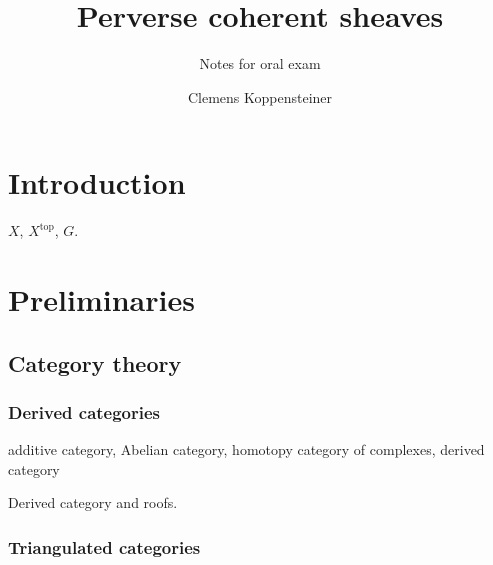 \documentclass[english]{short-notes}
\title{Perverse coherent sheaves}
\subtitle{Notes for oral exam}
\author{Clemens Koppensteiner}
\begin{document}
\renewcommand\top{\mathrm{top}}
\renewcommand\dual{\mathbb D}

\maketitle

\tableofcontents

\section{Introduction}

$X$, $X^\top$, $G$.

\section{Preliminaries}

\subsection{Category theory}

\subsubsection{Derived categories}\label{sec:derived_categories}

\begin{Def}
    additive category,
    Abelian category,
    homotopy category of complexes,
    derived category
\end{Def}

Derived category and roofs.

\subsubsection{Triangulated categories}\label{sec:triangulated_categories}
\end{document}

